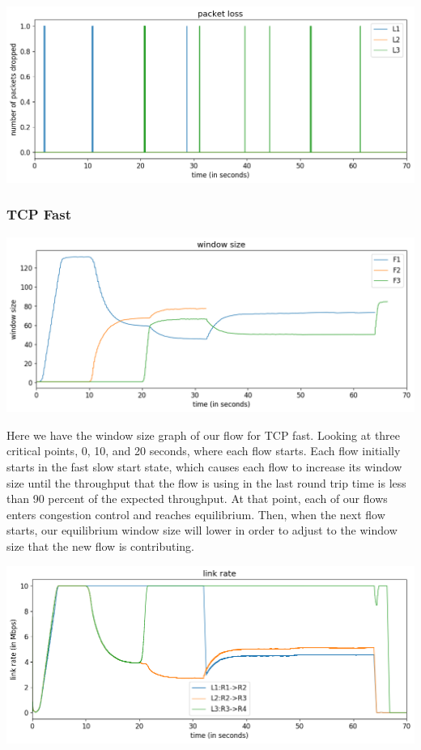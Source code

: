 \documentclass{article}
\begin{document}
\includegraphics[width = \textwidth]{"test_case2_reno packet loss"}




\subsubsection{TCP Fast}

\includegraphics[width = \textwidth]{"test_case2_fast window size"}

Here we have the window size graph of our flow for TCP fast. Looking at three critical points, 0, 10, and 20 seconds, where each flow starts. Each flow initially starts in the fast slow start state, which causes each flow to increase its window size until the throughput that the flow is using in the last round trip time is less than 90 percent of the expected throughput. At that point, each of our flows enters congestion control and reaches equilibrium. Then, when the next flow starts, our equilibrium window size will lower in order to adjust to the window size that the new flow is contributing.

\includegraphics[width = \textwidth]{"test_case2_fast link rate"}
\end{document}

